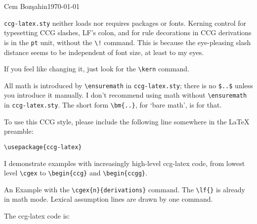 \documentclass[11pt]{article}
\begin{document}
\hfill{\small Cem Boz\c{s}ahin}\hfill\today\medskip\bigskip

\noindent \verb|ccg-latex.sty| neither loads nor requires  packages or fonts. Kerning control for typesetting CCG slashes, LF's colon, and for rule decorations in CCG derivations is in the \verb|pt| unit, without the \verb|\!| command. This is because the eye-pleasing slash distance seems to be independent of font size, at least to my eyes.

If you feel like changing it, just look for the \verb|\kern| command. 

All math is introduced by \verb|\ensuremath| in \verb|ccg-latex.sty|; 
there is no \verb|$..$| unless you introduce it manually. I don't recommend
using math without \verb|\ensuremath| in \verb|ccg-latex.sty|.
The short form \verb|\bm{..}|, for `bare math', is for that.

To use this CCG style, please include the following line somewhere in the \LaTeX\,preamble:\medskip

\begin{verbatim}
\usepackage{ccg-latex}
\end{verbatim}\medskip

I demonstrate examples with increasingly high-level ccg-latex code, from lowest
level \verb|\cgex| to \verb|\begin{ccg}| and \verb|\begin{ccgg}|.\bigskip

An Example with the \verb|\cgex{n}{derivations}| command. The \verb|\lf{}| is already in math mode.
Lexical assumption lines are drawn by one command.
\bigskip

\medskip\bigskip

The ccg-latex code is:
\end{document}
